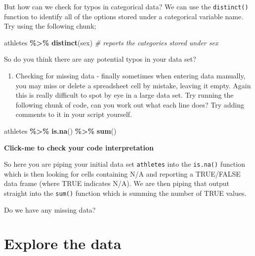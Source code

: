 \documentclass[
]{book}
\newenvironment{Shaded}{\begin{snugshade}}{\end{snugshade}}
\newcommand{\CommentTok}[1]{\textcolor[rgb]{0.56,0.35,0.01}{\textit{#1}}}
\newcommand{\FunctionTok}[1]{\textcolor[rgb]{0.13,0.29,0.53}{\textbf{#1}}}
\newcommand{\NormalTok}[1]{#1}
\newcommand{\SpecialCharTok}[1]{\textcolor[rgb]{0.81,0.36,0.00}{\textbf{#1}}}
\providecommand{\tightlist}{%
  \setlength{\itemsep}{0pt}\setlength{\parskip}{0pt}}
\begin{document}
But how can we check for typos in categorical data? We can use the \texttt{distinct()} function to identify all of the options stored under a categorical variable name. Try using the following chunk;

\begin{Shaded}
\begin{Highlighting}[]
\NormalTok{athletes }\SpecialCharTok{\%\textgreater{}\%} 
  \FunctionTok{distinct}\NormalTok{(sex) }\CommentTok{\# reports the categories stored under sex}
\end{Highlighting}
\end{Shaded}

So do you think there are any potential typos in your data set?

\begin{enumerate}
\def\labelenumi{\arabic{enumi})}
\setcounter{enumi}{2}
\tightlist
\item
  Checking for missing data - finally sometimes when entering data manually, you may miss or delete a spreadsheet cell by mistake, leaving it empty. Again this is really difficult to spot by eye in a large data set. Try running the following chunk of code, can you work out what each line does? Try adding comments to it in your script yourself.
\end{enumerate}

\begin{Shaded}
\begin{Highlighting}[]
\NormalTok{athletes }\SpecialCharTok{\%\textgreater{}\%} 
  \FunctionTok{is.na}\NormalTok{() }\SpecialCharTok{\%\textgreater{}\%} 
  \FunctionTok{sum}\NormalTok{()}
\end{Highlighting}
\end{Shaded}

\textbf{Click-me to check your code interpretation}

So here you are piping your initial data set \texttt{athletes} into the \texttt{is.na()} function which is then looking for cells containing N/A and reporting a TRUE/FALSE data frame (where TRUE indicates N/A). We are then piping that output straight into the \texttt{sum()} function which is summing the number of TRUE values.

Do we have any missing data?

\section{Explore the data}\label{explore-the-data}
\end{document}
